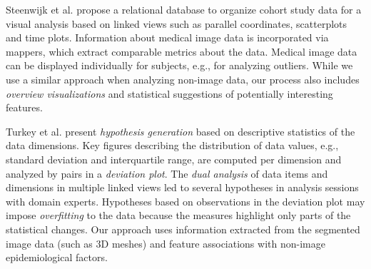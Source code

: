 \documentclass[journal]{style/vgtc} 			          %
\begin{document}
Steenwijk et al. \cite{Steenwijk2010} propose a relational database to organize cohort study data for a visual analysis based on linked views such as parallel coordinates, scatterplots and time plots.
%
Information about medical image data is incorporated via mappers, which extract comparable metrics about the data.
%
Medical image data can be displayed individually for subjects, e.g., for analyzing outliers.
%
While we use a similar approach when analyzing non-image data, our process also includes \emph{overview visualizations} and statistical suggestions of potentially interesting features.
%

Turkey et al. \cite{Turkay2013} present \emph{hypothesis generation} based on descriptive statistics of the data dimensions.
%
Key figures describing the distribution of data values, e.g., standard deviation and interquartile range, are computed per dimension and analyzed by pairs in a \emph{deviation plot}.
%
%
The \emph{dual analysis} of data items and dimensions in multiple linked views led to several hypotheses in analysis sessions with domain experts.
%
Hypotheses based on observations in the deviation plot may impose \emph{overfitting} to the data because the measures highlight only parts of the statistical changes.
%
Our approach uses information extracted from the segmented image data (such as 3D meshes) and feature associations with non-image epidemiological factors.
\end{document}
